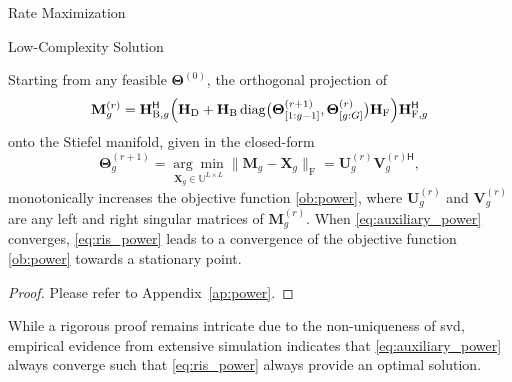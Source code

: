 \documentclass[journal]{IEEEtran}
\begin{document}
\begin{section}{Rate Maximization}
\begin{subsection}{Low-Complexity Solution}
		\begin{proposition}
			\label{pp:power}
			Starting from any feasible $\mathbf{\Theta}^{(0)}$, the orthogonal projection of
			\begin{equation}
				\label{eq:auxiliary_power}
				\mathbf{M}_g^{(r)} = \mathbf{H}_{\mathrm{B},g}^\mathsf{H} \Bigl(\mathbf{H}_\mathrm{D} + \mathbf{H}_\mathrm{B} \operatorname{diag}\bigl(\mathbf{\Theta}_{[1:g-1]}^{(r+1)},\mathbf{\Theta}_{[g:G]}^{(r)}\bigr) \mathbf{H}_\mathrm{F}\Bigr) \mathbf{H}_{\mathrm{F},g}^\mathsf{H}
			\end{equation}
			onto the Stiefel manifold, given in the closed-form \cite{Manton2002}
			\begin{equation}
				\label{eq:ris_power}
				\mathbf{\Theta}_g^{(r+1)} = \underset{\mathbf{X}_g \in \mathbb{U}^{L \times L}}{\arg\min} \lVert \mathbf{M}_g - \mathbf{X}_g \rVert _\mathrm{F} = \mathbf{U}_g^{(r)} \mathbf{V}_g^{(r)\mathsf{H}},
			\end{equation}
			monotonically increases the objective function \eqref{ob:power},
			where $\mathbf{U}_g^{(r)}$ and $\mathbf{V}_g^{(r)}$ are any left and right singular matrices of $\mathbf{M}_g^{(r)}$.
			When \eqref{eq:auxiliary_power} converges, \eqref{eq:ris_power} leads to a convergence of the objective function \eqref{ob:power} towards a stationary point.
		\end{proposition}

		\begin{proof}
			Please refer to Appendix~\ref{ap:power}.
		\end{proof}

		\begin{remark}
			\label{rm:power}
			While a rigorous proof remains intricate due to the non-uniqueness of \gls{svd},
			empirical evidence from extensive simulation indicates that
			\eqref{eq:auxiliary_power} always converge such that \eqref{eq:ris_power} always provide an optimal solution.
		\end{remark}


\end{subsection}
\end{section}
\end{document}
